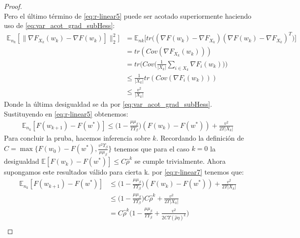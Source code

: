 \documentclass{book}
\theoremstyle{plain}
\theoremstyle{definition}
\theoremstyle{remark}
\begin{document}
\begin{proof}
\begin{equation}
\end{equation}
Pero el último término de \ref{eq:r-linear5} puede ser acotado superiormente haciendo uso de  \ref{eq:var_acot_grad_subHess}:
\begin{equation}\label{eq:r-linear6}
    \begin{split}
        \mathbb{E}_{n_k}[\|\nabla F_{X_k}(w_k) - \nabla F(w_k)]\|_2^2] & = \mathbb{E}_{nk}\bigg[tr\bigg((\nabla F(w_k)-\nabla F_{X_k})(\nabla F(w_k)-\nabla F_{X_k})^T\bigg)\bigg] \\
        & = tr(Cov(\nabla F_{X_k}(w_k))) \\
        & = tr\bigg(Cov\bigg(\frac{1}{|X_k|}\displaystyle\sum_{i\in X_k}\nabla F_i(w_k)\bigg)\bigg)\\
        & \leq \frac{1}{|X_k|}tr(Cov(\nabla F_i(w_k))) \\
        & \leq \frac{v^2}{|X_k|}
    \end{split}
\end{equation}
Donde la última desigualdad se da por \ref{eq:var_acot_grad_subHess}. Sustituyendo en \ref{eq:r-linear5} obtenemos:
\begin{equation}\label{eq:r-linear7}
    \begin{split}
        \mathbb{E}_{n_k}[F(w_{k+1})- F(w^*)] \leq\bigg(1 -\frac{\mu\mu_\beta}{\Upsilon\Upsilon_\beta}\bigg)(F(w_k) - F(w^*))+ \frac{v^2}{2\Upsilon|X_k|}
    \end{split}
\end{equation}
Para concluir la pruba, hacemos inferencia sobre $k$. Recordando la definición de $C = \max\bigg\{F(w_0) - F(w^*), \frac{v^2\Upsilon_\beta}{\mu\mu_\beta}\bigg\}$ tenemos que para el caso $k=0$ la desigualdad $\mathbb{E}[F(w_k) - F(w^*)] \leq C\hat{\rho}^k$ se cumple trivialmente. Ahora supongamos este resultados válido para cierta k. por \ref{eq:r-linear7} tenemos que:
\begin{equation}\label{eq:r-linear8}
    \begin{split}
        \mathbb{E}_{n_k}[F(w_{k+1})- F(w^*)] & \leq\bigg(1 -\frac{\mu\mu_\beta}{\Upsilon\Upsilon_\beta}\bigg)(F(w_k) - F(w^*))+ \frac{v^2}{2\Upsilon|X_k|}\\
        & \leq \bigg(1 -\frac{\mu\mu_\beta}{\Upsilon\Upsilon_\beta}\bigg)C\hat{\rho}^k+ \frac{v^2}{2\Upsilon|X_k|}\\
        & = C\hat{\rho}^k\bigg(1 -\frac{\mu\mu_\beta}{\Upsilon\Upsilon_\beta}+ \frac{v^2}{2C\Upsilon(\hat{\rho}\eta)^k}\bigg)\\
    \end{split}

\end{equation}
\end{proof}
\end{document}
